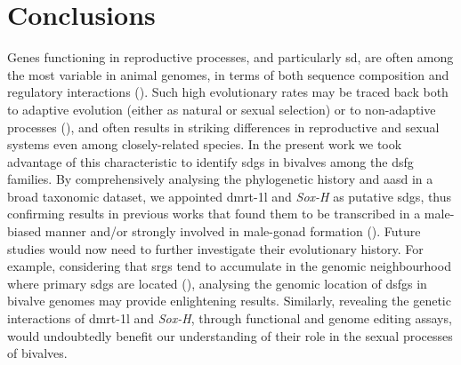 \section{Conclusions} \label{chapter:molecularEvolution-conclusions}
Genes functioning in reproductive processes, and particularly \gls{sd}, are often among the most variable in animal genomes, in terms of both sequence composition and regulatory interactions (). Such high evolutionary rates may be traced back both to adaptive evolution (either as natural or sexual selection) or to non-adaptive processes (), and often results in striking differences in reproductive and sexual systems even among closely-related species. In the present work we took advantage of this characteristic to identify \glspl{sdg} in bivalves among the \gls{dsfg} families. By comprehensively analysing the phylogenetic history and \gls{aasd} in a broad taxonomic dataset, we appointed \gls{dmrt-1l} and \textit{Sox-H} as putative \glspl{sdg}, thus confirming results in previous works that found them to be transcribed in a male-biased manner and/or strongly involved in male-gonad formation (). Future studies would now need to further investigate their evolutionary history. For example, considering that \glspl{srg} tend to accumulate in the genomic neighbourhood where primary \glspl{sdg} are located (), analysing the genomic location of \glspl{dsfg} in bivalve genomes may provide enlightening results. Similarly, revealing the genetic interactions of \gls{dmrt-1l} and \textit{Sox-H}, through functional and genome editing assays, would undoubtedly benefit our understanding of their role in the sexual processes of bivalves.

% 
